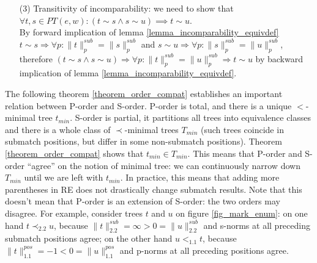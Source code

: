 \documentclass[AMA,STIX1COL]{WileyNJD-v2}
\newcommand{\pnorm}[2]{\|{#1}\|^{pos}_{#2}}
\newcommand{\snorm}[2]{\|{#1}\|^{sub}_{#2}}
\begin{document}
\begin{proofEnd}
\begin{itemize}[itemsep=0.5em]
        \item[(3)]
            Transitivity of incomparability: we need to show that $\forall t, s \in PT(e,w): (t \sim s \wedge s \sim u) \implies t \sim u$.
            \\[0.5em]
            By forward implication of lemma \ref{lemma_incomparability_equivdef}
            $t \sim s \Rightarrow \forall p : \snorm{t}{p} = \snorm{s}{p}$ and
            $s \sim u \Rightarrow \forall p : \snorm{s}{p} = \snorm{u}{p}$, therefore
            $(t \sim s \wedge s \sim u) \Rightarrow \forall p : \snorm{t}{p} = \snorm{u}{p} \Rightarrow t \sim u$
            by backward implication of lemma \ref{lemma_incomparability_equivdef}.
    \end{itemize}
\end{proofEnd}

The following theorem \ref{theorem_order_compat} establishes an important relation between P-order and S-order.
P-order is total, and there is a unique $<$-minimal tree $t_{min}$.
S-order is partial, it partitions all trees into equivalence classes
and there is a whole class of $\prec$-minimal trees $T_{min}$
(such trees coincide in submatch positions, but differ in some non-submatch positions).
Theorem \ref{theorem_order_compat} shows that $t_{min} \in T_{min}$.
This means that P-order and S-order ``agree'' on the notion of minimal tree:
we can continuously narrow down $T_{min}$ until we are left with $t_{min}$.
In practice, this means that adding more parentheses in RE does not drastically change submatch results.
%
Note that this doesn't mean that P-order is an extension of S-order:
the two orders may disagree.
For example, consider trees $t$ and $u$ on figure \ref{fig_mark_enum}:
on one hand $t \prec_{2.2} u$, because $\snorm{t}{2.2} = \infty > 0 = \snorm{u}{2.2}$ and s-norms at all preceding submatch positions agree;
on the other hand $u <_{1.1} t$, because $\pnorm{t}{1.1} = -1 < 0 = \pnorm{u}{1.1}$
and p-norms at all preceding positions agree.
\end{document}
